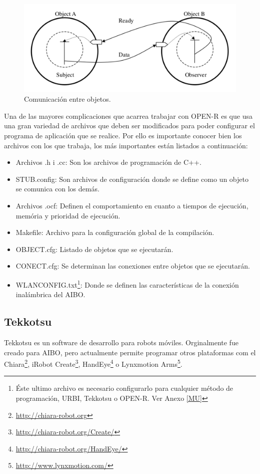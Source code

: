 \documentclass[12pt,a4paper,final,twoside]{book}
\begin{document}
\begin{figure}[h!]
	\centering
    \includegraphics[scale=0.5]{images/ObjectCom.pdf}
	 \caption{Comunicación entre objetos.}
  \label{fig:objectcom}
\end{figure}

Una de las mayores complicaciones que acarrea trabajar con OPEN-R es que usa una gran variedad de archivos que deben ser modificados para poder configurar el programa de aplicación que se realice. Por ello es importante conocer bien los archivos con los que trabaja, los más importantes están listados a continuación: 

\begin{itemize}
\item Archivos .h i .cc: Son los archivos de programación de C++.
\item STUB.config: Son archivos de configuración donde se define como un objeto se comunica con los demás.
\item Archivos .ocf: Definen el comportamiento en cuanto a tiempos de ejecución, memória y prioridad de ejecución.
\item Makefile: Archivo para la configuración global de la compilación.
\item OBJECT.cfg: Listado de objetos que se ejecutarán.
\item CONECT.cfg: Se determinan las conexiones entre objetos que se ejecutarán.
\item WLANCONFIG.txt\footnote{Éste ultimo archivo es necesario configurarlo para cualquier método de programación, URBI, Tekkotsu o OPEN-R. Ver Anexo \ref{MU}}: Donde se definen las características de la conexión inalámbrica del AIBO.
\end{itemize}

\subsection{Tekkotsu}
Tekkotsu es un software de desarrollo para robots móviles. Orginalmente fue creado para AIBO, pero actualmente permite programar otros plataformas com el Chiara\footnote{\url{http://chiara-robot.org}}, iRobot Create\footnote{\url{http://chiara-robot.org/Create/}}, HandEye\footnote{\url{http://chiara-robot.org/HandEye/}} o Lynxmotion Arms\footnote{\url{http://www.lynxmotion.com/}}.
\end{document}
